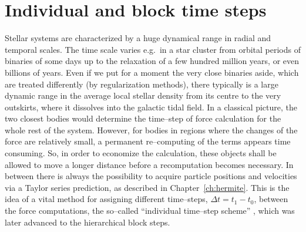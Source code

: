 
\section{Individual and block time steps}
\label{ch:timesteps}

Stellar systems are characterized by a huge dynamical range in
radial and temporal scales.
The time scale varies e.g.\ in a star cluster from orbital periods
of binaries of some days up to the relaxation of a few hundred
million years, or even billions of years.
Even if we put for a moment the very close binaries aside,
which are treated differently (by regularization methods),
there typically is a large dynamic range in the average local
stellar density from its centre to the very outskirts, where it
dissolves into the galactic tidal field.
In a classical picture, the two closest bodies would determine
the time--step of force calculation for the whole rest of the
system.
However, for bodies in regions where the changes of the force are
relatively small, a permanent re--computing of the terms appears
time consuming.
So, in order to economize the calculation, these objects shall
be allowed to move a longer distance before a recomputation
becomes necessary.
In between there is always the possibility to acquire particle
positions and velocities via a Taylor series prediction,
as described in Chapter~\ref{ch:hermite}.
This is the idea of a vital method for assigning different
time--steps, $\Delta t = t_1 - t_0$, between the force
computations, the so--called ``individual time--step scheme''
\cite{a_63}, which was later advanced to the hierarchical
block steps.


